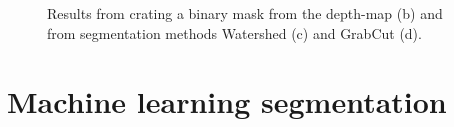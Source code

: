 \begin{figure}[t]
\centering
{}
\newline
\centering
{}
\caption[Results from various segmentation methods.]{Results from crating a binary mask from the depth-map (b) and from segmentation methods Watershed (c) and GrabCut (d).}
\label{fig:results-pre-f}
\end{figure}

\section{Machine learning segmentation}
\label{sec:learning-segmentation}

